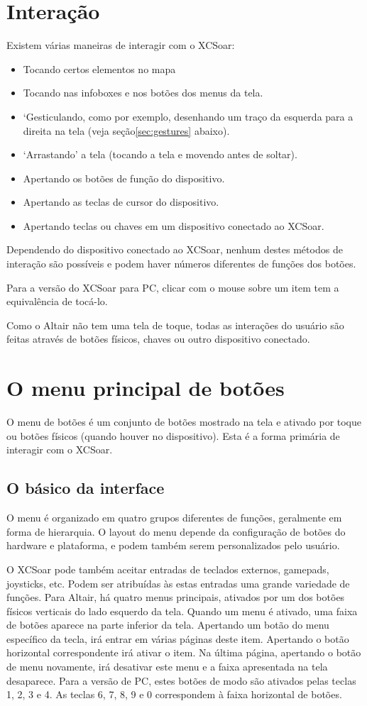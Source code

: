 \section{Interação}
Existem várias maneiras de interagir com o XCSoar:
\begin{itemize}
\item Tocando certos elementos no mapa
\item Tocando nas infoboxes e nos botões dos menus da tela.
\item `Gesticulando, como por exemplo, desenhando um traço da esquerda para a direita na tela (veja seção\ref{sec:gestures} abaixo).
\item ‘Arrastando’ a tela (tocando a tela e movendo antes de soltar).
\item Apertando os botões de função do dispositivo.
\item Apertando as teclas de cursor do dispositivo.
\item Apertando teclas ou chaves em um dispositivo conectado ao XCSoar.
\end{itemize}

Dependendo do dispositivo conectado ao XCSoar, nenhum destes métodos de interação são possíveis e podem haver números diferentes de funções dos botões.

Para a versão do XCSoar para PC, clicar com o mouse sobre um item tem a equivalência de tocá-lo.

Como o Altair não tem uma tela de toque, todas as interações do usuário são feitas através de botões físicos, chaves ou outro dispositivo conectado.  


\section{O menu principal de botões}
O menu de botões é um conjunto de botões mostrado na tela e ativado por toque ou botões físicos (quando houver no dispositivo).  Esta é a forma primária de interagir com o XCSoar.

\subsection*{O básico da interface}
O menu é organizado em quatro grupos diferentes de funções, geralmente em forma de hierarquia.  O layout do menu depende da configuração de botões do hardware e plataforma, e podem também serem personalizados pelo usuário.

O XCSoar pode também aceitar entradas de teclados externos, gamepads, joysticks, etc.  Podem ser atribuídas às estas entradas uma grande variedade de funções.
Para Altair, há quatro menus principais, ativados por um dos botões físicos verticais do lado esquerdo da tela.  Quando um menu é ativado, uma faixa de botões aparece na parte inferior da tela.  Apertando um botão do menu específico da tecla, irá entrar em várias páginas deste item.  Apertando o botão horizontal correspondente irá ativar o item.  Na última página, apertando o botão de menu novamente, irá desativar este menu e a faixa apresentada na tela desaparece.
Para a versão de PC, estes botões de modo são ativados pelas teclas 1, 2, 3 e 4.  As teclas 6, 7, 8, 9 e 0 correspondem à faixa horizontal de botões.

